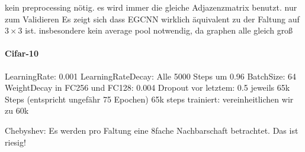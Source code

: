 kein preprocessing nötig.
es wird immer die gleiche Adjazenzmatrix benutzt.
nur zum Validieren
Es zeigt sich dass \gls{EGCNN} wirklich äquivalent zu der Faltung auf $3 \times 3$ ist.
insbesondere kein average pool notwendig, da graphen alle gleich groß

\begin{table}[t]
\centering
{}
\caption[Testgenauigkeiten der \gls{MNIST} Superpixelrepräsentationen]{10k steps}
\label{tab:train_mnist}
\end{table}

\paragraph{\gls{Cifar}-10}




LearningRate: 0.001
LearningRateDecay: Alle 5000 Steps um 0.96
BatchSize: 64
WeightDecay in FC256 und FC128: 0.004
Dropout vor letztem: 0.5
jeweils 65k Steps (entspricht ungefähr 75 Epochen)
65k steps trainiert: vereinheitlichen wir zu 60k

Chebyshev: Es werden pro Faltung eine 8fache Nachbarschaft betrachtet.
Das ist riesig!

\begin{table}[t]
\centering
{}
\caption[Testgenauigkeiten der \gls{Cifar}-10 Superpixelrepräsentationen]{65k steps}
\label{tab:train_cifar_10}
\end{table}

